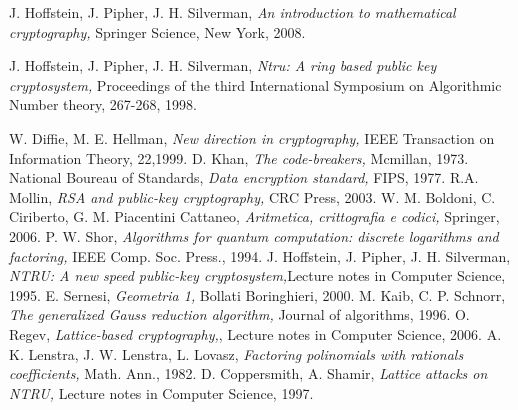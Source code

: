 \documentclass[a4paper,12pt]{report}
\theoremstyle{plain}
\theoremstyle{definition}
\theoremstyle{remark}
\begin{document}
\begin{thebibliography}{Bibliografia}
\bibitem {-}J. Hoffstein, J. Pipher, J. H. Silverman, \textit{An introduction to mathematical cryptography,} Springer Science, New York, 2008.

\bibitem {-}J. Hoffstein, J. Pipher, J. H. Silverman, \textit{Ntru: A ring based public key cryptosystem,} Proceedings of the third International Symposium on Algorithmic Number theory, 267-268, 1998.

\bibitem{-}W. Diffie, M. E. Hellman, \textit{New direction in cryptography,} IEEE Transaction on Information Theory, 22,1999.
\bibitem{-} D. Khan, \textit{The code-breakers,} Mcmillan, 1973.
\bibitem{-} National Boureau of Standards, \textit{Data encryption standard,} FIPS, 1977.
\bibitem{-} R.A. Mollin, \textit{RSA and public-key cryptography,} CRC Press, 2003.
\bibitem {-} W. M. Boldoni, C. Ciriberto, G. M. Piacentini Cattaneo, \textit{Aritmetica, crittografia e codici,} Springer, 2006.
\bibitem{-} P. W. Shor, \textit{Algorithms for quantum computation: discrete logarithms and factoring,} IEEE Comp. Soc. Press., 1994.
\bibitem{-} J. Hoffstein, J. Pipher, J. H. Silverman, \textit{NTRU: A new speed public-key cryptosystem,}Lecture notes in Computer Science, 1995.
\bibitem {-} E. Sernesi, \textit{Geometria 1,} Bollati Boringhieri, 2000.
\bibitem{-} M. Kaib, C. P. Schnorr, \textit{The generalized Gauss reduction algorithm,} Journal of algorithms, 1996.
\bibitem {-} O. Regev, \textit{Lattice-based cryptography,}, Lecture notes in Computer Science, 2006.
\bibitem {-} A. K. Lenstra, J. W. Lenstra, L. Lovasz, \textit{Factoring polinomials with rationals coefficients,} Math. Ann., 1982.
\bibitem {-} D. Coppersmith, A. Shamir, \textit{Lattice attacks on NTRU,} Lecture notes in Computer Science, 1997.
\end{thebibliography}
\end{document}
